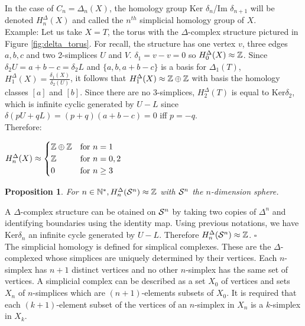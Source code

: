 \documentclass[12pt, a4paper]{article}
\newtheorem{proposition}{Proposition}
\newenvironment{proof}{{\sc Proof:}}{\hfill $\square$}
\begin{document}
In the case of $C_n = \Delta_n(X)$, the homology group Ker $\delta_n$/Im $\delta_{n+1}$ will be denoted $H^\Delta_n(X)$ and called the $n^{th}$ simplicial homology group of $X$. \\

Example: Let us take $X = T$, the torus with the $\Delta$-complex structure pictured in Figure \ref{fig:delta_torus}. For recall, the structure has one vertex $v$, three edges $a, b, c$ and two 2-simplices $U$ and $V$. $\delta_1 = v - v = 0$ so $H_0^\Delta(X) \approx \Z$. Since $\delta_2 U = a + b - c = \delta_2 L$ and $\{a, b, a+ b - c\}$ is a basis for $\Delta_1(T)$, $H_1^\Delta(X) = \frac{\delta_1(X)}{\delta_2(U)}$, it follows that $H_1^\Delta(X) \approx \Z \oplus \Z$ with basis the homology classes $[a]$ and $[b]$. Since there are no 3-simplices, $H_2^\Delta(T)$ is equal to Ker$\delta_2$, which is infinite cyclic generated by $U-L$ since $\delta(pU+qL) = (p+q)(a+b-c) = 0$ iff $p = -q$.\\

Therefore:
\begin{center}
  $H_n^\Delta(X) \approx
  \begin{cases}
    \Z \oplus \Z &\text{for $n=1$}\\
    \Z &\text{for $n=0,2$}\\
    0 &\text{for $n\ge3$}
  \end{cases}$
\end{center}

\begin{proposition}
  For $n \in \N^*, H_n^\Delta(\S^n) \approx \Z$ with $\S^n$ the $n$-dimension sphere.
\end{proposition}
\begin{proof}
A $\Delta$-complex structure can be otained on $\S^n$ by taking two copies of $\Delta^n$ and identifying boundaries using the identity map. Using previous notations, we have Ker$\delta_n$ an infinite cycle generated by $U-L$. Therefore $H_n^\Delta(\S^n) \approx \Z$.
\end{proof}\\

The simplicial homology is defined for simplical complexes. These are the $\Delta$-complexed whose simplices are uniquely determined by their vertices. Each $n$-simplex has $n+1$ distinct vertices and no other $n$-simplex has the same set of vertices. A simplicial complex can be described as a set $X_0$ of vertices and sets $X_n$ of $n$-simplices which are $(n+1)$-elements subsets of $X_0$. It is required that each $(k+1)$-element subset of the vertices of an $n$-simplex in $X_n$ is a $k$-simplex in $X_k$.\\
\end{document}
